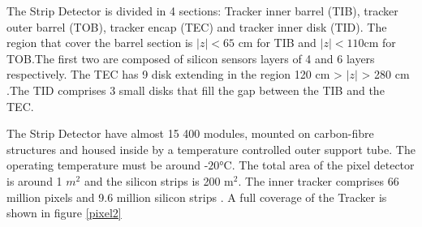 The Strip Detector is divided in 4 sections: Tracker inner barrel (TIB), tracker outer barrel (TOB), tracker encap (TEC) and tracker inner disk (TID). The region that cover the barrel section is $|z|<65$ cm for TIB and $|z|<110$cm for TOB.The first two are composed  of silicon sensors layers of 4 and 6 layers respectively.  The TEC has 9 disk extending in the region 120 cm > $|z|$ > 280 cm .The 
TID comprises 3 small disks that fill the gap between the TIB and the TEC.


The Strip Detector have almost 15 400 modules, mounted on
carbon-fibre structures and housed inside by a temperature controlled outer support tube. The operating temperature must be around -$\ang{20}$C. 
The total area of the pixel detector is around 1 $m^2$ and the silicon strips is 200 m$^2$. 
The inner tracker comprises 66 million pixels and 9.6
million silicon strips \cite{cms-manual}.
A full coverage of the Tracker is shown in figure \ref{pixel2}
\\

